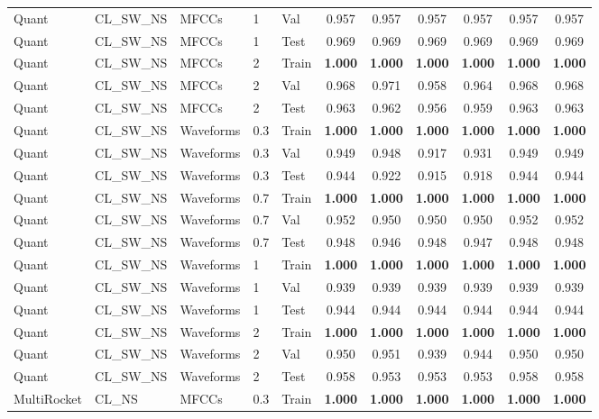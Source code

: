 \begin{landscape}
\begin{longtable}{|l|l|l|l|l|c|c|c|c|c|c|}
Quant & CL\_SW\_NS & MFCCs & 1 & Val & 0.957 & 0.957 & 0.957 & 0.957 & 0.957 & 0.957 \\
Quant & CL\_SW\_NS & MFCCs & 1 & Test & 0.969 & 0.969 & 0.969 & 0.969 & 0.969 & 0.969 \\
Quant & CL\_SW\_NS & MFCCs & 2 & Train & \textbf{1.000} & \textbf{1.000} & \textbf{1.000} & \textbf{1.000} & \textbf{1.000} & \textbf{1.000} \\
Quant & CL\_SW\_NS & MFCCs & 2 & Val & 0.968 & 0.971 & 0.958 & 0.964 & 0.968 & 0.968 \\
Quant & CL\_SW\_NS & MFCCs & 2 & Test & 0.963 & 0.962 & 0.956 & 0.959 & 0.963 & 0.963 \\
Quant & CL\_SW\_NS & Waveforms & 0.3 & Train & \textbf{1.000} & \textbf{1.000} & \textbf{1.000} & \textbf{1.000} & \textbf{1.000} & \textbf{1.000} \\
Quant & CL\_SW\_NS & Waveforms & 0.3 & Val & 0.949 & 0.948 & 0.917 & 0.931 & 0.949 & 0.949 \\
Quant & CL\_SW\_NS & Waveforms & 0.3 & Test & 0.944 & 0.922 & 0.915 & 0.918 & 0.944 & 0.944 \\
Quant & CL\_SW\_NS & Waveforms & 0.7 & Train & \textbf{1.000} & \textbf{1.000} & \textbf{1.000} & \textbf{1.000} & \textbf{1.000} & \textbf{1.000} \\
Quant & CL\_SW\_NS & Waveforms & 0.7 & Val & 0.952 & 0.950 & 0.950 & 0.950 & 0.952 & 0.952 \\
Quant & CL\_SW\_NS & Waveforms & 0.7 & Test & 0.948 & 0.946 & 0.948 & 0.947 & 0.948 & 0.948 \\
Quant & CL\_SW\_NS & Waveforms & 1 & Train & \textbf{1.000} & \textbf{1.000} & \textbf{1.000} & \textbf{1.000} & \textbf{1.000} & \textbf{1.000} \\
Quant & CL\_SW\_NS & Waveforms & 1 & Val & 0.939 & 0.939 & 0.939 & 0.939 & 0.939 & 0.939 \\
Quant & CL\_SW\_NS & Waveforms & 1 & Test & 0.944 & 0.944 & 0.944 & 0.944 & 0.944 & 0.944 \\
Quant & CL\_SW\_NS & Waveforms & 2 & Train & \textbf{1.000} & \textbf{1.000} & \textbf{1.000} & \textbf{1.000} & \textbf{1.000} & \textbf{1.000} \\
Quant & CL\_SW\_NS & Waveforms & 2 & Val & 0.950 & 0.951 & 0.939 & 0.944 & 0.950 & 0.950 \\
Quant & CL\_SW\_NS & Waveforms & 2 & Test & 0.958 & 0.953 & 0.953 & 0.953 & 0.958 & 0.958 \\
MultiRocket & CL\_NS & MFCCs & 0.3 & Train & \textbf{1.000} & \textbf{1.000} & \textbf{1.000} & \textbf{1.000} & \textbf{1.000} & \textbf{1.000} \\

\end{longtable}
\end{landscape}
